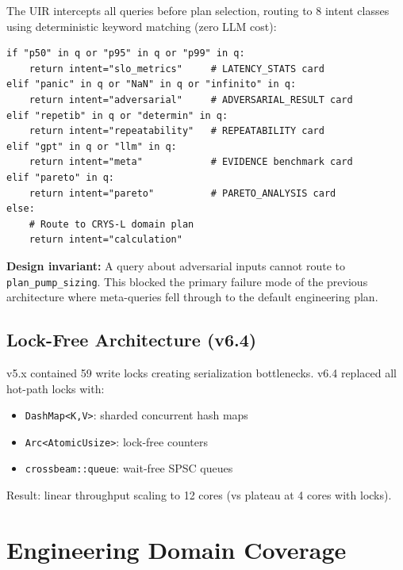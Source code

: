 \documentclass[11pt]{article}
\begin{document}
The UIR intercepts all queries before plan selection, routing to 8 intent classes
using deterministic keyword matching (zero LLM cost):

\begin{lstlisting}[caption={UIR decision tree (Python, simplified)}]
if "p50" in q or "p95" in q or "p99" in q:
    return intent="slo_metrics"     # LATENCY_STATS card
elif "panic" in q or "NaN" in q or "infinito" in q:
    return intent="adversarial"     # ADVERSARIAL_RESULT card
elif "repetib" in q or "determin" in q:
    return intent="repeatability"   # REPEATABILITY card
elif "gpt" in q or "llm" in q:
    return intent="meta"            # EVIDENCE benchmark card
elif "pareto" in q:
    return intent="pareto"          # PARETO_ANALYSIS card
else:
    # Route to CRYS-L domain plan
    return intent="calculation"
\end{lstlisting}

\textbf{Design invariant:} A query about adversarial inputs cannot route to
\texttt{plan\_pump\_sizing}. This blocked the primary failure mode of the previous
architecture where meta-queries fell through to the default engineering plan.

\subsection{Lock-Free Architecture (v6.4)}

v5.x contained 59 write locks creating serialization bottlenecks.
v6.4 replaced all hot-path locks with:
\begin{itemize}
\item \texttt{DashMap<K,V>}: sharded concurrent hash maps
\item \texttt{Arc<AtomicUsize>}: lock-free counters
\item \texttt{crossbeam::queue}: wait-free SPSC queues
\end{itemize}
Result: linear throughput scaling to 12 cores (vs plateau at 4 cores with locks).

\section{Engineering Domain Coverage}
\end{document}
